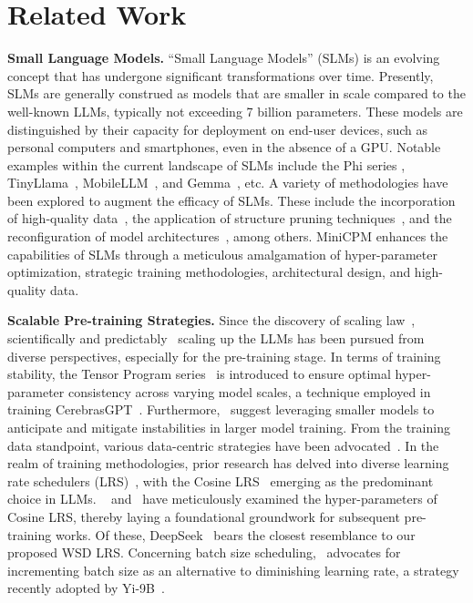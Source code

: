 \vspace{-5mm}
\section{Related Work}
\vspace{-2mm}
\textbf{Small Language Models.} ``Small Language Models'' (SLMs) is an evolving concept that has undergone significant transformations over time. Presently, SLMs are generally construed as models that are smaller in scale compared to the well-known LLMs, typically not exceeding 7 billion parameters. These models are distinguished by their capacity for deployment on end-user devices, such as personal computers and smartphones, even in the absence of a GPU. Notable examples within the current landscape of SLMs include the Phi series \citep{gunasekar2023textbooks, li2023textbooks, Javaheripi2023Phi2}, TinyLlama~\citep{zhang2024tinyllama}, MobileLLM~\citep{liu2024mobilellm}, and Gemma~\citep{Banks2024Gemma}, etc. 
A variety of methodologies have been explored to augment the efficacy of SLMs. These include the incorporation of high-quality data~\citep{gunasekar2023textbooks, li2023textbooks, Javaheripi2023Phi2}, the application of structure pruning techniques~\citep{xia2023sheared}, and the reconfiguration of model architectures~\citep{liu2024mobilellm}, among others. MiniCPM enhances the capabilities of SLMs through a meticulous amalgamation of hyper-parameter optimization, strategic training methodologies, architectural design, and high-quality data.

\textbf{Scalable Pre-training Strategies.} Since the discovery of scaling law~\citep{kaplan2020scaling, rae2021scaling, aghajanyan2023scaling}, scientifically and predictably~\citep{achiam2023gpt,hu2023unlock, du2024understanding} scaling up the LLMs has been pursued from diverse perspectives, especially for the pre-training stage. In terms of training stability, the Tensor Program series~\citep{yang2022tensor, yang2023tensor} is introduced to ensure optimal hyper-parameter consistency across varying model scales, a technique employed in training CerebrasGPT~\citep{dey2023cerebras}. Furthermore,~\cite{wortsman2023small} suggest leveraging smaller models to anticipate and mitigate instabilities in larger model training. From the training data standpoint, various data-centric strategies have been advocated~\citep{xie2024doremi, shi2023context, ye2024data}. In the realm of training methodologies, prior research has delved into diverse learning rate schedulers (LRS)~\citep{howard2018universal, raffel2020exploring, hundt2019sharpdarts}, with the Cosine LRS~\citep{loshchilov2016sgdr} emerging as the predominant choice in LLMs. ~\cite{kaplan2020scaling} and~\cite{hoffmann2022training} have meticulously examined the hyper-parameters of Cosine LRS, thereby laying a foundational groundwork for subsequent pre-training works. Of these, DeepSeek~\citep{bi2024deepseek} bears the closest resemblance to our proposed WSD LRS. Concerning batch size scheduling,~\cite{smith2017don} advocates for incrementing batch size as an alternative to diminishing learning rate, a strategy recently adopted by Yi-9B~\citep{young2024yi}.
